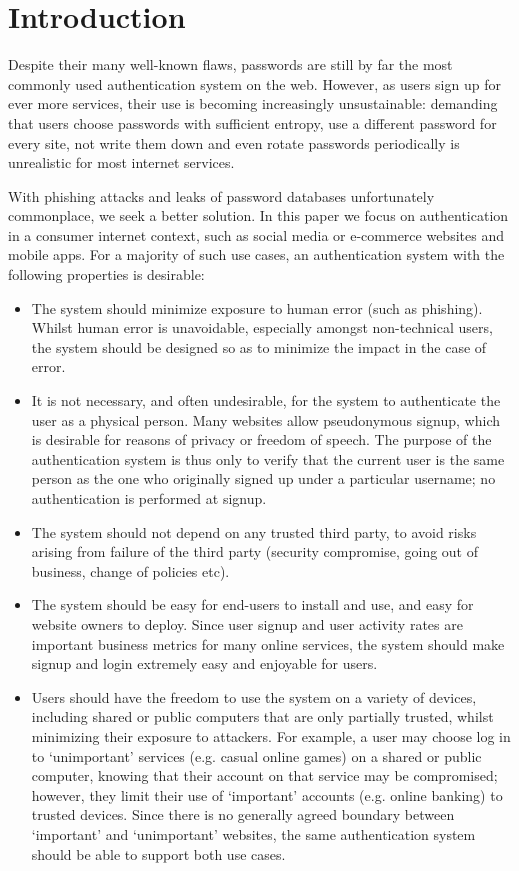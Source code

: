 \section{Introduction}

Despite their many well-known flaws, passwords are still by far the most commonly used
authentication system on the web. However, as users sign up for ever more services, their use is
becoming increasingly unsustainable: demanding that users choose passwords with sufficient entropy,
use a different password for every site, not write them down and even rotate passwords periodically
is unrealistic for most internet services.

With phishing attacks and leaks of password databases unfortunately commonplace, we seek a better
solution. In this paper we focus on authentication in a consumer internet context, such as social
media or e-commerce websites and mobile apps. For a majority of such use cases, an authentication
system with the following properties is desirable:

\begin{itemize}
\item The system should minimize exposure to human error (such as phishing). Whilst human error
is unavoidable, especially amongst non-technical users, the system should be designed so as to
minimize the impact in the case of error.
\item It is not necessary, and often undesirable, for the system to authenticate the user as a
physical person. Many websites allow pseudonymous signup, which is desirable for reasons of privacy
or freedom of speech. The purpose of the authentication system is thus only to verify that the
current user is the same person as the one who originally signed up under a particular username; no
authentication is performed at signup.
\item The system should not depend on any trusted third party, to avoid risks arising from failure
of the third party (security compromise, going out of business, change of policies etc).
\item The system should be easy for end-users to install and use, and easy for website owners to
deploy. Since user signup and user activity rates are important business metrics for many online
services, the system should make signup and login extremely easy and enjoyable for users.
\item Users should have the freedom to use the system on a variety of devices, including shared or
public computers that are only partially trusted, whilst minimizing their exposure to attackers.
For example, a user may choose log in to `unimportant' services (e.g. casual online games) on a
shared or public computer, knowing that their account on that service may be compromised; however,
they limit their use of `important' accounts (e.g. online banking) to trusted devices. Since there
is no generally agreed boundary between `important' and `unimportant' websites, the same
authentication system should be able to support both use cases.
\end{itemize}

